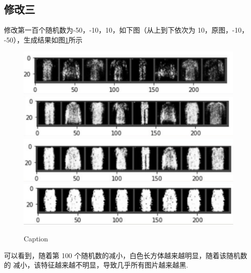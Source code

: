 \documentclass[UTF8,a4paper,10pt]{ctexart}
\begin{document}
\subsection{修改三}
修改第一百个随机数为-50，-10，10，如下图（从上到下依次为 10，原图，-10，
-50），生成结果如图\ref{fig:1}所示
\begin{figure}[H]
    \centering
    \includegraphics[scale=0.5]{12.png}
    \includegraphics[scale=0.5]{13.png}
    \includegraphics[scale=0.5]{14.png}
    \includegraphics[scale=0.5]{15.png}
    \caption{Caption}
    \label{fig:1}
\end{figure}

可以看到，随着第 100 个随机数的减小，白色长方体越来越明显，随着该随机数的
减小，该特征越来越不明显，导致几乎所有图片越来越黑.





\end{document}
